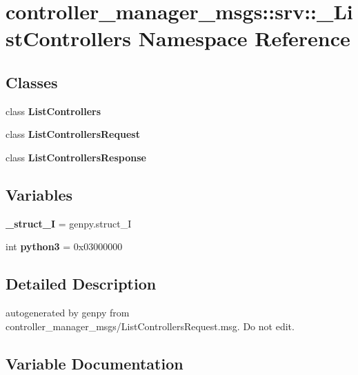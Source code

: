 \section{controller\-\_\-manager\-\_\-msgs\-:\-:srv\-:\-:\-\_\-\-List\-Controllers \-Namespace \-Reference}
\label{namespacecontroller__manager__msgs_1_1srv_1_1__ListControllers}
\subsection*{\-Classes}
\begin{DoxyCompactItemize}
\item 
class {\bf \-List\-Controllers}
\item 
class {\bf \-List\-Controllers\-Request}
\item 
class {\bf \-List\-Controllers\-Response}
\end{DoxyCompactItemize}
\subsection*{\-Variables}
\begin{DoxyCompactItemize}
\item 
{\bf \-\_\-struct\-\_\-\-I} = genpy.\-struct\-\_\-\-I
\item 
int {\bf python3} = 0x03000000
\end{DoxyCompactItemize}


\subsection{\-Detailed \-Description}
\begin{DoxyVerb}autogenerated by genpy from controller_manager_msgs/ListControllersRequest.msg. Do not edit.\end{DoxyVerb}
 

\subsection{\-Variable \-Documentation}
